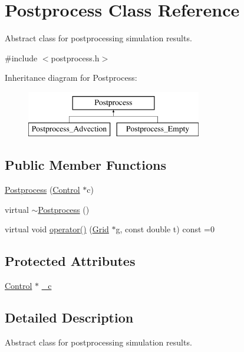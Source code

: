 \hypertarget{class_postprocess}{}\section{Postprocess Class Reference}
\label{class_postprocess}


Abstract class for postprocessing simulation results.  




{\ttfamily \#include $<$postprocess.\+h$>$}

Inheritance diagram for Postprocess\+:\begin{figure}[H]
\begin{center}
\leavevmode
\includegraphics[height=2.000000cm]{class_postprocess}
\end{center}
\end{figure}
\subsection*{Public Member Functions}
\begin{DoxyCompactItemize}
\item 
\hyperlink{class_postprocess_ac9807b3daa36d99136f8385cc9b9a8a9}{Postprocess} (\hyperlink{class_control}{Control} $\ast$c)
\item 
virtual \hyperlink{class_postprocess_abcbe895c34b2694d2ebaa4a0b8e57ca1}{$\sim$\+Postprocess} ()
\item 
virtual void \hyperlink{class_postprocess_afd99ba74ef69d05be2f8d5bd80f0dd7a}{operator()} (\hyperlink{class_grid}{Grid} $\ast$g, const double t) const =0
\end{DoxyCompactItemize}
\subsection*{Protected Attributes}
\begin{DoxyCompactItemize}
\item 
\hyperlink{class_control}{Control} $\ast$ \hyperlink{class_postprocess_a808baccc80afb5cb6a3c28650001357a}{\+\_\+c}
\end{DoxyCompactItemize}


\subsection{Detailed Description}
Abstract class for postprocessing simulation results. 

